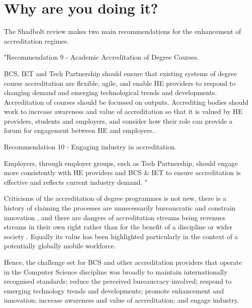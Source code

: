 \documentclass[sigconf]{acmart}
\begin{document}
\section {Why are you doing it?}	

The Shadbolt review \cite[p.~8]{shadbolt2016shadbolt} makes two main recommendations for the enhancement of accreditation regimes.
\begin{center} 
	\begin{textit} 
	"Recommendation 9 - Academic Accreditation of Degree Courses.
	

		BCS, IET and Tech Partnership should ensure that existing systems of degree course
	accreditation are flexible, agile, and enable HE providers to respond to changing
	demand and emerging technological trends and developments. Accreditation of courses
	should be focussed on outputs. Accrediting bodies should work to increase awareness
	and value of accreditation so that it is valued by HE providers, students and employers,
	and consider how their role can provide a forum for engagement between HE and
	employers.. 

	Recommendation 10 - Engaging industry in accreditation.

	Employers, through employer groups, such as Tech Partnership, should engage more
	consistently with HE providers and BCS \& IET to ensure accreditation is effective and
	reflects current industry demand.
	"
	\end{textit}
\end{center}

Criticisms of the accreditation of degree programmes is not new, there is a history of claiming the processes are unnecessarily bureaucratic and constrain  innovation \cite{Harvey2004},  and there are dangers of accreditation streams being revenues streams in their own right rather than for the benefit of a discipline or wider society \cite{Knight_2015}.
Equally its value has been highlighted particularly in the context of a potentially globally mobile workforce.

Hence, the challenge set for BCS and other accreditation providers that operate in the Computer Science discipline was broadly to maintain internationally recognised standards; reduce the perceived bureaucracy involved; respond to emerging technology trends and developments; promote enhancement and innovation; increase awareness and value of accreditation; and engage industry.
\end{document}
